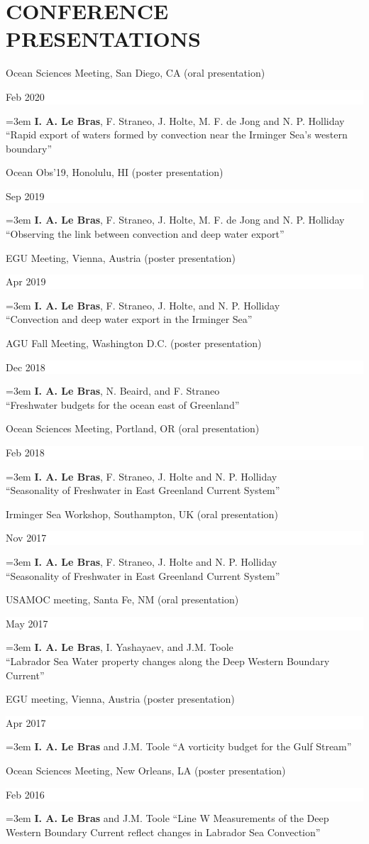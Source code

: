 \documentclass[paper=letter,fontsize=11pt]{scrartcl} %
\newcommand{\sepspace}{\vspace*{3mm}}		%
\newcommand{\NewPart}[2]{\section*{\uppercase{#1} #2}}
\newcommand{\ConfEntry}[5]{
		\noindent #1 (#2) \hfill      %
		\colorbox{White}{%
			\parbox{6em}{%
			\hfill\color{Black}#3}} \par %
		\noindent \hangindent=3em\hangafter=0 #4 ``#5'' \sepspace}
\begin{document}
\NewPart{Conference presentations}{}

\ConfEntry{Ocean Sciences Meeting, San Diego, CA}{oral presentation}{Feb 2020}{\textbf{I. A. Le Bras}, F. Straneo, J. Holte, M. F. de Jong and N. P. Holliday\\}{Rapid export of waters formed by convection near the Irminger Sea's western boundary}


\ConfEntry{Ocean Obs'19, Honolulu, HI}{poster presentation}{Sep 2019}{\textbf{I. A. Le Bras}, F. Straneo, J. Holte, M. F. de Jong and N. P. Holliday\\}{Observing the link between convection and deep water export}

\ConfEntry{EGU Meeting, Vienna, Austria}{poster presentation}{Apr 2019}{\textbf{I. A. Le Bras}, F. Straneo, J. Holte, and N. P. Holliday\\}{Convection and deep water export in the Irminger Sea}

\ConfEntry{AGU Fall Meeting, Washington D.C.}{poster presentation}{Dec 2018}{\textbf{I. A. Le Bras}, N. Beaird, and F. Straneo\\}{Freshwater budgets for the ocean east of Greenland}

\ConfEntry{Ocean Sciences Meeting, Portland, OR}{oral presentation}{Feb 2018}{\textbf{I. A. Le Bras}, F. Straneo, J. Holte and N. P. Holliday\\}{Seasonality of Freshwater in East Greenland Current System}

\ConfEntry{Irminger Sea Workshop, Southampton, UK}{oral presentation}{Nov 2017}{\textbf{I. A. Le Bras}, F. Straneo, J. Holte and N. P. Holliday\\}{Seasonality of Freshwater in East Greenland Current System}

\ConfEntry{USAMOC meeting, Santa Fe, NM}{oral presentation}{May 2017}{\textbf{I. A. Le Bras}, I. Yashayaev, and J.M. Toole\\}{Labrador Sea Water property changes along the Deep Western Boundary Current}

\ConfEntry{EGU meeting, Vienna, Austria}{poster presentation}{Apr 2017}{\textbf{I. A. Le Bras} and J.M. Toole}{A vorticity budget for the Gulf Stream}

\ConfEntry{Ocean Sciences Meeting, New Orleans, LA}{poster presentation}{Feb 2016}{\textbf{I. A. Le Bras} and J.M. Toole}{Line W Measurements of the Deep Western Boundary Current reflect changes in Labrador Sea Convection}
\end{document}
